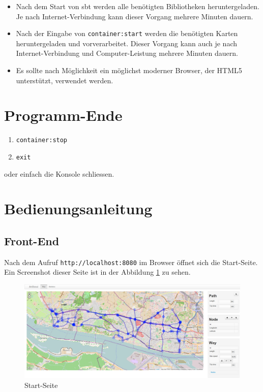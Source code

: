 \documentclass[
  a4paper,
  10pt
]{scrreprt}
\begin{document}
\begin{itemize}
  \item Nach dem Start von \gls{sbt} werden alle benötigten Bibliotheken heruntergeladen.
    Je nach Internet-Verbindung kann dieser Vorgang mehrere Minuten dauern.
  \item Nach der Eingabe von \texttt{container:start} werden die benötigten Karten heruntergeladen und vorverarbeitet.
    Dieser Vorgang kann auch je nach Internet-Verbindung und Computer-Leistung mehrere Minuten dauern.
  \item Es sollte nach Möglichkeit ein möglichst moderner Browser, der HTML5 unterstützt, verwendet werden.
\end{itemize}

\section{Programm-Ende}
\label{sec:programm-ende}

\begin{enumerate}
  \item \texttt{container:stop}
  \item \texttt{exit}
\end{enumerate}

oder einfach die Konsole schliessen.

\section{Bedienungsanleitung}
\label{sec:bedienungsanleitung}

\subsection{Front-End}
\label{sec:front-end}

Nach dem Aufruf \texttt{http://localhost:8080} im Browser öffnet sich die Start-Seite.
Ein Screenshot dieser Seite ist in der Abbildung \ref{fig:start-seite} zu sehen.

\begin{figure}[htbp]
  \centering
  \includegraphics[width=\textwidth]{Bilder/Start-Seite.png}
  \caption{Start-Seite}
  \label{fig:start-seite}
\end{figure}
\end{document}
